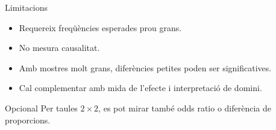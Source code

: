 \documentclass[10pt,aspectratio=169]{beamer}
\begin{document}
\begin{frame}[fragile]{Limitacions}
\begin{itemize}
  \item Requereix freqüències esperades prou grans.
  \item No mesura causalitat.
  \item Amb mostres molt grans, diferències petites poden ser significatives.
  \item Cal complementar amb mida de l'efecte i interpretació de domini.
\end{itemize}
\begin{block}{Opcional}
Per taules $2\times 2$, es pot mirar també odds ratio o diferència de proporcions.
\end{block}
\end{frame}
\end{document}
